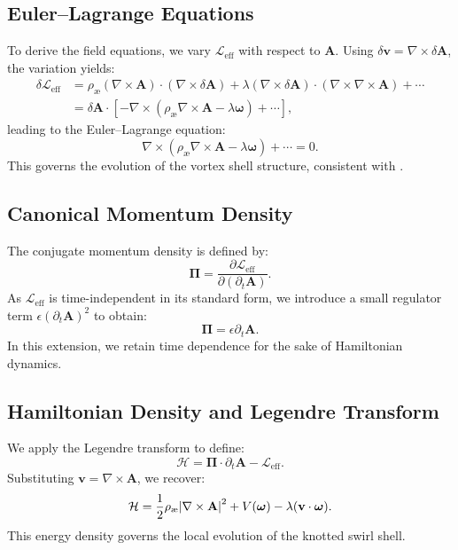 \documentclass[preprint,notitlepage]{revtex4-2}
\begin{document}
    \subsection*{Euler–Lagrange Equations}
    To derive the field equations, we vary $\mathcal{L}_{\text{eff}}$ with respect to $\mathbf{A}$. Using $\delta \mathbf{v} = \nabla \times \delta \mathbf{A}$, the variation yields:
    \begin{align}
    \delta \mathcal{L}_{\text{eff}} &= \rho_{\text{\ae}} (\nabla \times \mathbf{A}) \cdot (\nabla \times \delta \mathbf{A}) + \lambda (\nabla \times \delta \mathbf{A}) \cdot (\nabla \times \nabla \times \mathbf{A}) + \cdots \\
    &= \delta \mathbf{A} \cdot \left[ - \nabla \times ( \rho_{\text{\ae}} \nabla \times \mathbf{A} - \lambda \boldsymbol{\omega} ) + \cdots \right],
    \end{align}
    leading to the Euler–Lagrange equation:
    \begin{equation}
    \nabla \times ( \rho_{\text{\ae}} \nabla \times \mathbf{A} - \lambda \boldsymbol{\omega} ) + \cdots = 0.
    \end{equation}
    This governs the evolution of the vortex shell structure, consistent with \cite{VAM4}.
    
    \subsection*{Canonical Momentum Density}
    The conjugate momentum density is defined by:
    \begin{equation}
    \boldsymbol{\Pi} = \frac{\partial \mathcal{L}_{\text{eff}}}{\partial (\partial_t \mathbf{A})}.
    \end{equation}
    As $\mathcal{L}_{\text{eff}}$ is time-independent in its standard form, we introduce a small regulator term $\epsilon (\partial_t \mathbf{A})^2$ to obtain:
    \begin{equation}
    \boldsymbol{\Pi} = \epsilon \partial_t \mathbf{A}.
    \end{equation}
    In this extension, we retain time dependence for the sake of Hamiltonian dynamics.
    
    \subsection*{Hamiltonian Density and Legendre Transform}
    We apply the Legendre transform to define:
    \begin{equation}
    \mathcal{H} = \boldsymbol{\Pi} \cdot \partial_t \mathbf{A} - \mathcal{L}_{\text{eff}}.
    \end{equation}
    Substituting $\mathbf{v} = \nabla \times \mathbf{A}$, we recover:
    \begin{equation}
    \mathcal{H} = \frac{1}{2} \rho_{\text{\ae}} \abs{\nabla \times \mathbf{A}}^2 + V(\boldsymbol{\omega}) - \lambda (\mathbf{v} \cdot \boldsymbol{\omega}).
    \end{equation}
    This energy density governs the local evolution of the knotted swirl shell.
    
\end{document}
